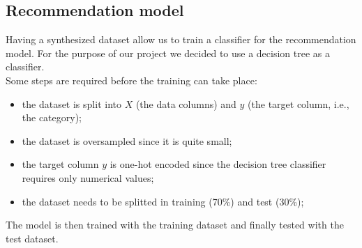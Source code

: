 \documentclass[../../main]{subfiles}
\begin{document}
\subsection{Recommendation model}
\label{ss:recommendation-model}

Having a synthesized dataset allow us to train a classifier for the recommendation model.
For the purpose of our project we decided to use a decision tree as a classifier.\\
Some steps are required before the training can take place:
\begin{itemize}
    \item the dataset is split into $X$ (the data columns) and $y$ (the target column, i.e., the category);
    \item the dataset is oversampled since it is quite small;
    \item the target column $y$ is one-hot encoded since the decision tree classifier requires only numerical values;
    \item the dataset needs to be splitted in training (70\%) and test (30\%);
\end{itemize}
The model is then trained with the training dataset and finally tested with the test dataset.
\end{document}
